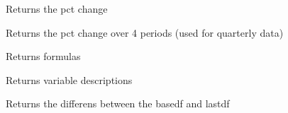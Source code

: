 \documentclass[letterpaper,10pt,english]{sphinxmanual}
\begin{document}
\begin{fulllineitems}
\begin{fulllineitems}
\end{fulllineitems}


\begin{fulllineitems}
\label{\detokenize{index:modelvis.vis.pct}}
\pysigstartsignatures
{}
\pysigstopsignatures
\sphinxAtStartPar
Returns the pct change

\end{fulllineitems}


\begin{fulllineitems}
\label{\detokenize{index:modelvis.vis.year_pct}}
\pysigstartsignatures
{}
\pysigstopsignatures
\sphinxAtStartPar
Returns the pct change over 4 periods (used for quarterly data)

\end{fulllineitems}


\begin{fulllineitems}
\label{\detokenize{index:modelvis.vis.frml}}
\pysigstartsignatures
{}
\pysigstopsignatures
\sphinxAtStartPar
Returns formulas

\end{fulllineitems}


\begin{fulllineitems}
\label{\detokenize{index:modelvis.vis.des}}
\pysigstartsignatures
{}
\pysigstopsignatures
\sphinxAtStartPar
Returns variable descriptions

\end{fulllineitems}


\begin{fulllineitems}
\label{\detokenize{index:modelvis.vis.dif}}
\pysigstartsignatures
{}
\pysigstopsignatures
\sphinxAtStartPar
Returns the differens between the basedf and lastdf


\end{fulllineitems}
\end{fulllineitems}
\end{document}
